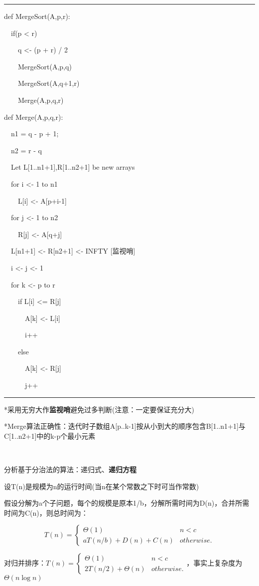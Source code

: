 \documentclass[a4paper,UTF8,fontset=windows]{ctexart}
\newenvironment{code}{\rule{36em}{0.1em}\setlength{\parindent}{1em}

}{

\setlength{\parindent}{0em}\rule{36em}{0.1em}}
\begin{document}
\begin{code}
def MergeSort(A,p,r):

\ \ if(p < r)

\ \ \ \ q <- (p + r) / 2

\ \ \ \ MergeSort(A,p,q)

\ \ \ \ MergeSort(A,q+1,r)

\ \ \ \ Merge(A,p,q,r)

def Merge(A,p,q,r):

\ \ n1 = q - p + 1;

\ \ n2 = r - q

\ \ Let L[1..n1+1],R[1..n2+1] be new arrays

\ \ for i <- 1 to n1

\ \ \ \ L[i] <- A[p+i-1]

\ \ for j <- 1 to n2

\ \ \ \ R[j] <- A[q+j]

\ \ L[n1+1] <- R[n2+1] <- INFTY [监视哨]

\ \ i <- j <- 1

\ \ for k <- p to r

\ \ \ \ if L[i] <= R[j]

\ \ \ \ \ \ A[k] <- L[i]

\ \ \ \ \ \ i++

\ \ \ \ else

\ \ \ \ \ \ A[k] <- R[j]

\ \ \ \ \ \ j++
\end{code}

*\hspace{0em}采用无穷大作\textbf{监视哨}避免过多判断(注意：一定要保证充分大)

*Merge算法正确性：迭代时子数组A[p..k-1]按从小到大的顺序包含B[1..n1+1]与C[1..n2+1]中的k-p个最小元素

\

分析基于分治法的算法：递归式、\textbf{递归方程}

设T(n)是规模为n的运行时间(当n在某个常数之下时可当作常数)

假设分解为a个子问题，每个的规模是原本1/b，分解所需时间为D(n)，合并所需时间为C(n)，则总时间为：

$$T(n)=\begin{cases}\Theta(1)&n<c\\aT(n/b)+D(n)+C(n)&otherwise.\end{cases}$$

对归并排序：$T(n)=\begin{cases}\Theta(1)&n<c\\2T(n/2)+\Theta(n)&otherwise.\end{cases}$，事实上复杂度为$\Theta(n\log n)$
\end{document}
